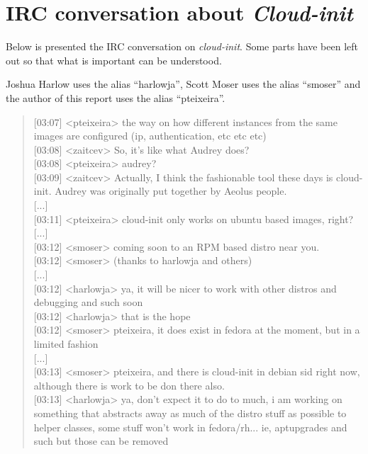 \chapter{IRC conversation about \textit{Cloud-init}} \label{chap:ap3}

Below is presented the IRC conversation on \textit{cloud-init}. Some parts have been left out so that what is important can be understood.

Joshua Harlow uses the alias ``harlowja'', Scott Moser uses the alias ``smoser'' and the author of this report uses the alias ``pteixeira''.

\begin{verse}
{[}03:07{]} {<}pteixeira{>} the way on how different instances from the same images are configured (ip, authentication, etc etc etc)\\
{[}03:08{]} {<}zaitcev{>} So, it's like what Audrey does?\\
{[}03:08{]} {<}pteixeira{>} audrey?\\
{[}03:09{]} {<}zaitcev{>} Actually, I think the fashionable tool these days is cloud-init. Audrey was originally put together by Aeolus people.\\
{[}...{]}\\
{[}03:11{]} {<}pteixeira{>} cloud-init only works on ubuntu based images, right?\\
{[}...{]}\\
{[}03:12{]} {<}smoser{>} coming soon to an RPM based distro near you.\\
{[}03:12{]} {<}smoser{>} (thanks to harlowja and others)\\
{[}...{]}\\
{[}03:12{]} {<}harlowja{>} ya, it will be nicer to work with other distros and debugging and such soon\\
{[}03:12{]} {<}harlowja{>} that is the hope\\
{[}03:12{]} {<}smoser{>} pteixeira, it does exist in fedora at the moment, but in a limited fashion\\
{[}...{]}\\
{[}03:13{]} {<}smoser{>} pteixeira, and there is cloud-init in debian sid right now, although there is work to be don there also.\\
{[}03:13{]} {<}harlowja{>} ya, don't expect it to do to much, i am working on something that abstracts away as much of the distro stuff as possible to helper classes, some stuff won't work  in fedora/rh... ie, aptupgrades and such but those can be removed\\

\end{verse}

